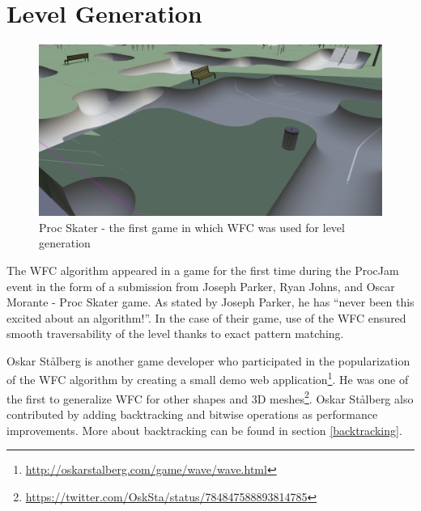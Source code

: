 \documentclass[shortabstract, english, inz]{iithesis}
\begin{document}
\section{Level Generation}
\begin{figure}[H]
\centering
\includegraphics[width=1\textwidth, angle=0]{images/skater.png}
\caption{Proc Skater - the first game in which WFC was used for level generation \cite{skater}}
\label{fig:skater}
\end{figure}
The WFC algorithm appeared in a game for the first time during the ProcJam event in the form of a submission from Joseph Parker, Ryan Johns, and Oscar Morante - Proc Skater game. As stated by Joseph Parker, he has “never been this excited about an algorithm!”. In the case of their game, use of the WFC ensured smooth traversability of the level thanks to exact pattern matching.
\break\break\break\break\break

 Oskar Stålberg is another game developer who participated in the popularization of the WFC algorithm by creating a small demo web application\footnote{\url{http://oskarstalberg.com/game/wave/wave.html}}. He was one of the first to generalize WFC for other shapes and 3D meshes\footnote{\url{https://twitter.com/OskSta/status/784847588893814785}}. Oskar Stålberg also contributed by adding backtracking and bitwise operations as performance improvements. \cite{Smith} More about backtracking can be found in section \ref{backtracking}.
\end{document}
